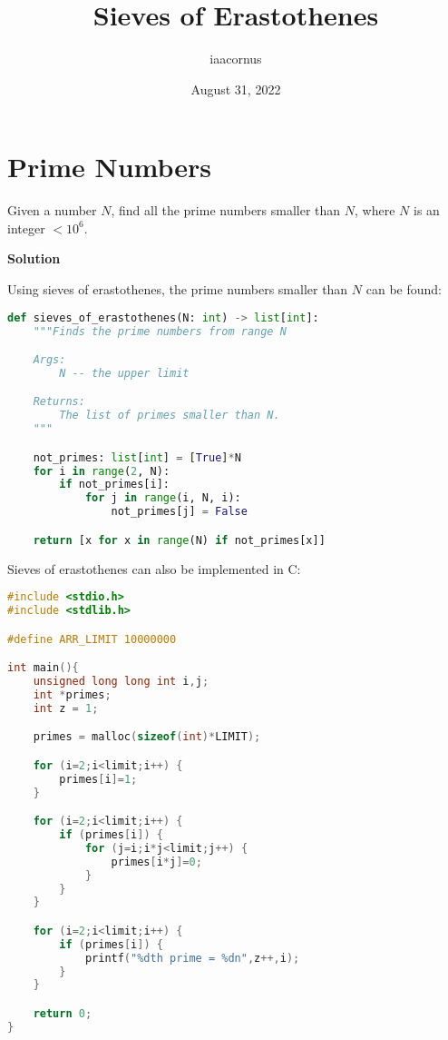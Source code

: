 \documentclass[12pt, UTF8]{article}
\title{Sieves of Erastothenes}
\author{iaacornus}
\date{August 31, 2022}
\begin{document}
	\maketitle
	
	\section*{Prime Numbers}
	
	Given a number $N$, find all the prime numbers smaller than $N$, where $N$ is an integer $< 10^6$.
	
	\textbf{Solution}
	
	Using sieves of erastothenes, the prime numbers smaller than $N$ can be found:
	
\begin{lstlisting}[language=Python]
def sieves_of_erastothenes(N: int) -> list[int]:
    """Finds the prime numbers from range N

    Args:
        N -- the upper limit

    Returns:
        The list of primes smaller than N.
    """

    not_primes: list[int] = [True]*N
    for i in range(2, N):
        if not_primes[i]:
            for j in range(i, N, i):
                not_primes[j] = False

    return [x for x in range(N) if not_primes[x]]
\end{lstlisting}
	
	Sieves of erastothenes can also be implemented in C:
	
\begin{lstlisting}[language=C]
#include <stdio.h>
#include <stdlib.h>

#define ARR_LIMIT 10000000

int main(){
    unsigned long long int i,j;
    int *primes;
    int z = 1;

    primes = malloc(sizeof(int)*LIMIT);

    for (i=2;i<limit;i++) {
        primes[i]=1;
    }

    for (i=2;i<limit;i++) {
        if (primes[i]) {
            for (j=i;i*j<limit;j++) {
                primes[i*j]=0;
            }
        }
    }

    for (i=2;i<limit;i++) {
        if (primes[i]) {
            printf("%dth prime = %dn",z++,i);
        }
    }

    return 0;
}
\end{lstlisting}
\end{document}
